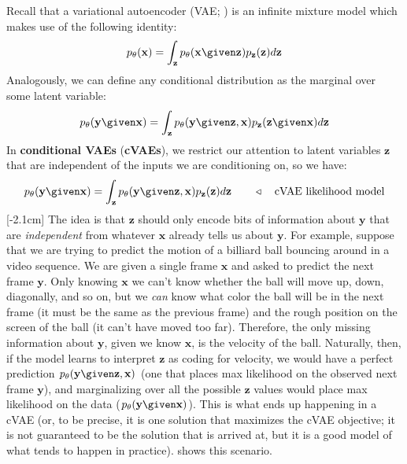 Recall that a variational autoencoder (VAE; \sect{\ref{sec:generative_modeling_and_representation_learning:VAEs}}) is an infinite mixture model which makes use of the following identity:
\begin{align}
    p_{\theta}(\mathbf{x}) = \int_{\mathbf{z}} p_{\theta}(\mathbf{x} \given \mathbf{z})p_{\mathbf{z}}(\mathbf{z})d\mathbf{z}
\end{align}
Analogously, we can define any conditional distribution as the marginal over some latent variable:
\begin{align}
    p_{\theta}(\mathbf{y} \given \mathbf{x}) = \int_{\mathbf{z}} p_{\theta}(\mathbf{y} \given \mathbf{z}, \mathbf{x})p_{\mathbf{z}}(\mathbf{z} \given \mathbf{x})d\mathbf{z}
\end{align}
In \textbf{conditional VAEs} (\textbf{cVAEs}), we restrict our attention to latent variables $\mathbf{z}$ that are independent of the inputs we are conditioning on, so we have:
\begin{align}
    p_{\theta}(\mathbf{y} \given \mathbf{x}) = \int_{\mathbf{z}} p_{\theta}(\mathbf{y} \given \mathbf{z}, \mathbf{x})p_{\mathbf{z}}(\mathbf{z})d\mathbf{z} \quad\quad \triangleleft \quad\text{cVAE likelihood model}
\end{align}[-2.1cm]
The idea is that $\mathbf{z}$ should only encode bits of information about $\mathbf{y}$ that are \textit{independent} from whatever $\mathbf{x}$ already tells us about $\mathbf{y}$. For example, suppose that we are trying to predict the motion of a billiard ball bouncing around in a video sequence. We are given a single frame $\mathbf{x}$ and asked to predict the next frame $\mathbf{y}$. Only knowing $\mathbf{x}$ we can't know whether the ball will move up, down, diagonally, and so on, but we \textit{can} know what color the ball will be in the next frame (it must be the same as the previous frame) and the rough position on the screen of the ball (it can't have moved too far). Therefore, the only missing information about $\mathbf{y}$, given we know $\mathbf{x}$, is the velocity of the ball. Naturally, then, if the model learns to interpret $\mathbf{z}$ as coding for velocity, we would have a perfect prediction $p_{\theta}(\mathbf{y} \given \mathbf{z}, \mathbf{x})$ (one that places max likelihood on the observed next frame $\mathbf{y}$), and marginalizing over all the possible $\mathbf{z}$ values would place max likelihood on the data ($p_{\theta}(\mathbf{y} \given \mathbf{x})$). This is what ends up happening in a cVAE (or, to be precise, it is one solution that maximizes the cVAE objective; it is not guaranteed to be the solution that is arrived at, but it is a good model of what tends to happen in practice). \Fig{\ref{fig:conditional_generative_models:cVAE_ball_bouncing_example}} shows this scenario.
